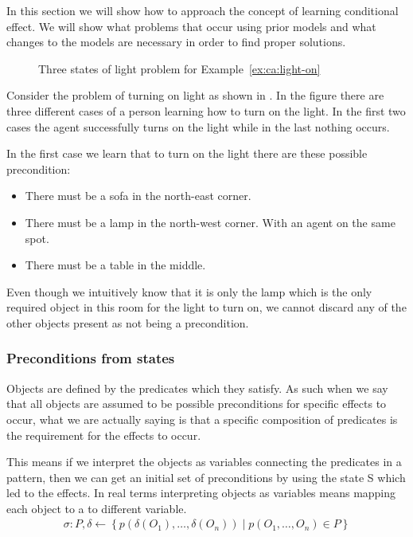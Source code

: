 \documentclass[../Master.tex]{subfiles}
\providecommand{\master}{..}
\begin{document}
In this section we will show how to approach the concept of learning conditional effect. We will show what problems that occur using prior models and what changes to the models are necessary in order to find proper solutions.

\begin{figure}
	\caption{\label{fig:ca:house-example}Three states of light problem for Example~\ref{ex:ca:light-on}}
\end{figure}

\begin{example}\label{ex:ca:light-on}
Consider the problem of turning on light as shown in .
In the figure there are three different cases of a person learning how to turn on the
light. In the first two cases the agent successfully turns on the light while in the last nothing occurs.

In the first case we learn that to turn on the light there are these possible precondition:
\begin{itemize}
	\item There must be a sofa in the north-east corner.
	\item There must be a lamp in the north-west corner. With an agent on the same spot.
	\item There must be a table in the middle.
\end{itemize}
Even though we intuitively know that it is only the lamp which is the only required object in this room for the light to turn on, we cannot discard any of the other objects present as not being a precondition.
\end{example}

\subsubsection{Preconditions from states}
Objects are defined by the predicates which they satisfy. As such when we say that all objects are assumed to be possible preconditions for specific effects to occur, what we are actually saying is that a specific composition of predicates is the requirement for the effects to occur.


This means if we interpret the objects as variables connecting the predicates in a pattern, then we can get an initial set of preconditions by using the state S which led to the effects. In real terms interpreting objects as variables means mapping each object 
to a to different variable.
\begin{align}
	&\sigma : P, \delta \leftarrow \left\{p\left(\delta(O_1),\ldots,\delta(O_n) \right) \mid p(O_1,\ldots,O_n) \in P  \right\}  &
\end{align}
\end{document}
